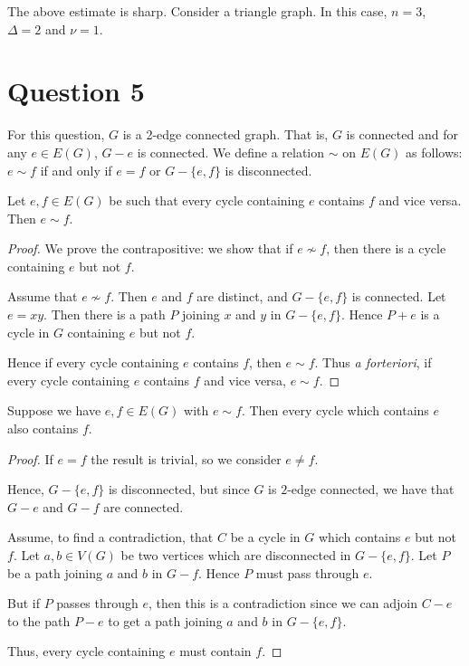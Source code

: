 \documentclass{unswmaths}
\begin{document}
\begin{remark}
    The above estimate is sharp. Consider a triangle graph. 
    In this case, $n = 3$, $\Delta = 2$ and $\nu = 1$.
\end{remark}


\section*{Question 5}
For this question, $G$ is a 2-edge connected graph. That is, $G$
is connected and for any $e \in E(G)$, $G-e$ is connected. 
We define a relation $\sim$ on $E(G)$ as follows: $e \sim f$ if and only
if $e = f$ or $G - \{e,f\}$ is disconnected.
\begin{proposition}[Part (a)]
\label{5a}
    Let $e,f \in E(G)$ be such that every cycle containing $e$ contains $f$
    and vice versa.
    Then $e \sim f$.
\end{proposition}
\begin{proof}    
    We prove the contrapositive: we show that if $e \nsim f$, then there
    is a cycle containing $e$ but not $f$.
    
    Assume that $e \nsim f$. Then $e$ and $f$ are distinct, and $G - \{e,f\}$
    is connected. Let $e = xy$. Then there is a path $P$ joining $x$ and $y$
    in $G - \{e,f\}$. Hence $P+e$ is a cycle in $G$ containing $e$ but not $f$. 
    
    Hence if every cycle containing $e$ contains $f$, then $e \sim f$.
    Thus \emph{a forteriori}, if every cycle containing $e$ contains $f$
    and vice versa, $e \sim f$.
\end{proof}

\begin{proposition}[Part (b)]
\label{5b}
Suppose we have $e,f \in E(G)$ with $e \sim f$. Then every cycle which contains $e$
also contains $f$.
\end{proposition}
\begin{proof}
    If $e = f$ the result is trivial, so we consider $e \neq f$. 
    
    Hence, $G - \{e,f\}$ is disconnected, but since $G$ is $2$-edge connected,
    we have that $G - e$ and $G-f$ are connected. 
    
    Assume, to find a contradiction, that $C$ be a cycle in $G$ which contains $e$ but not $f$. Let $a,b \in V(G)$
    be two vertices which are disconnected in $G-\{e,f\}$. Let $P$ be a path joining
    $a$ and $b$ in $G-f$. Hence $P$ must pass through $e$.
    
    But if $P$ passes through $e$, then this is a contradiction since we can adjoin $C-e$
    to the path $P-e$ to get a path joining $a$ and $b$ in $G-\{e,f\}$. 
    
    Thus, every cycle containing $e$ must contain $f$.
\end{proof}
\end{document}
